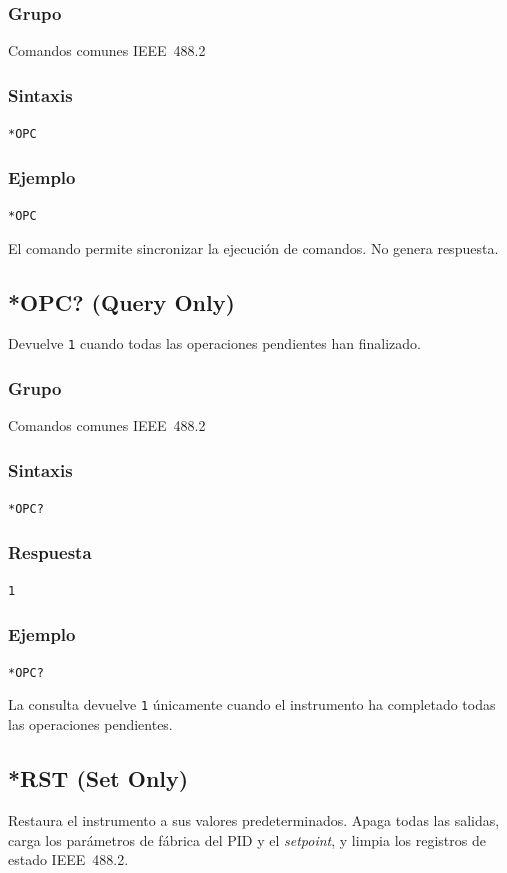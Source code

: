 \subsubsection*{Grupo}
Comandos comunes IEEE~488.2

\subsubsection*{Sintaxis}
\texttt{*OPC}

\subsubsection*{Ejemplo}
\texttt{*OPC}

El comando permite sincronizar la ejecución de comandos. No genera respuesta.

\subsection*{*OPC? (Query Only)}

Devuelve \texttt{1} cuando todas las operaciones pendientes han finalizado.

\subsubsection*{Grupo}
Comandos comunes IEEE~488.2

\subsubsection*{Sintaxis}
\texttt{*OPC?}

\subsubsection*{Respuesta}
\texttt{1}

\subsubsection*{Ejemplo}
\texttt{*OPC?}

La consulta devuelve \texttt{1} únicamente cuando el instrumento ha completado todas las operaciones pendientes.

\subsection*{*RST (Set Only)}

Restaura el instrumento a sus valores predeterminados. Apaga todas las salidas, carga los parámetros de fábrica del PID y el \textit{setpoint}, y limpia los registros de estado IEEE~488.2.

